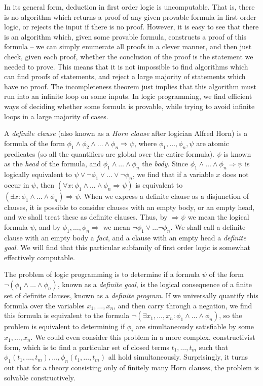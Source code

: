 In its general form, deduction in first order logic is uncomputable. That is, there is no algorithm which returns a proof of any given provable formula in first order logic, or rejects the input if there is no proof. However, it is easy to see that there is an algorithm which, given some provable formula, constructs a proof of this formula -- we can simply enumerate all proofs in a clever manner, and then just check, given each proof, whether the conclusion of the proof is the statement we needed to prove. This means that it is not impossible to find algorithms which can find proofs of statements, and reject a large majority of statements which have no proof. The incompleteness theorem just implies that this algorithm must run into an infinite loop on some inputs. In logic programming, we find efficient ways of deciding whether some formula is provable, while trying to avoid infinite loops in a large majority of cases.

A \emph{definite clause} (also known as a \emph{Horn clause} after logician Alfred Horn) is a formula of the form $\phi_1 \wedge \phi_2 \wedge \dots \wedge \phi_n \Rightarrow \psi$, where $\phi_1, \dots, \phi_n, \psi$ are atomic predicates (so all the quantifiers are global over the entire formula). $\psi$ is known as the \emph{head} of the formula, and $\phi_1 \wedge \dots \wedge \phi_n$ the \emph{body}. Since $\phi_1 \wedge \dots \wedge \phi_n \Rightarrow \psi$ is logically equivalent to $\psi \vee \neg \phi_1 \vee \dots \vee \neg \phi_n$, we find that if a variable $x$ does not occur in $\psi$, then $(\forall x: \phi_1 \wedge \dots \wedge \phi_n \Rightarrow \psi)$ is equivalent to $(\exists x: \phi_1 \wedge \dots \wedge \phi_n) \Rightarrow \psi$. When we express a definite clause as a disjunction of clauses, it is possible to consider clauses with an empty body, or an empty head, and we shall treat these as definite clauses. Thus, by $\Rightarrow \psi$ we mean the logical formula $\psi$, and by $\phi_1, \dots, \phi_n \Rightarrow$ we mean $\neg \phi_1 \vee \dots \neg \phi_n$. We shall call a definite clause with an empty body a \emph{fact}, and a clause with an empty head a \emph{definite goal}. We will find that this particular subfamily of first order logic is somewhat effectively computable.

The problem of logic programming is to determine if a formula $\psi$ of the form $\neg (\phi_1 \wedge \dots \wedge \phi_n)$, known as a \emph{definite goal}, is the logical consequence of a finite set of definite clauses, known as a \emph{definite program}. If we universally quantify this formula over the variables $x_1, \dots, x_n$, and then carry through a negation, we find this formula is equivalent to the formula $\neg (\exists x_1, \dots, x_n: \phi_1 \wedge \dots \wedge \phi_n)$, so the problem is equivalent to determining if $\phi_i$ are simultaneously satisfiable by some $x_1, \dots, x_n$. We could even consider this problem in a more complex, constructivist form, which is to find a particular set of closed terms $t_1, \dots, t_m$ such that $\phi_1(t_1, \dots, t_m), \dots, \phi_n(t_1, \dots, t_m)$ all hold simultaneously. Surprisingly, it turns out that for a theory consisting only of finitely many Horn clauses, the problem is solvable constructively.

